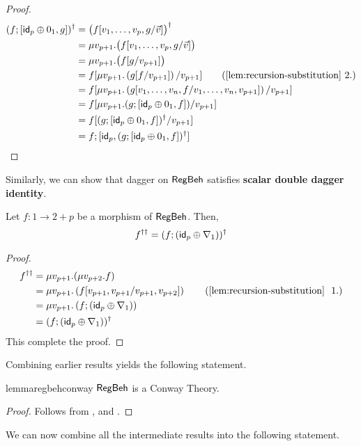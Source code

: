 \begin{proof}
\begin{align*}
(f ; \lc  \id_p \oplus 0_1 , g \rc)^\dagger & = \big(f[v_1,\dots,v_p, g/\vec{v}]\big)^\dagger	
\\
& = \mu v_{p+1}.\big(f[v_1,\dots,v_p, g/\vec{v}]\big)
\\
& = \mu v_{p+1}.\big(f[g/v_{p+1}]\big)
\\
& = f[\mu v_{p+1}. \left(g[f/v_{p+1}]\right)/v_{p+1}] \tag{\Cref{lem:recursion-substitution}~2.}
\\
& = f[\mu v_{p+1}. \left(g[v_1,\dots,v_n,f/v_1,\dots,v_n,v_{p+1}]\right)/v_{p+1}]\\
& = f[\mu v_{p+1}. (g ;  \lc  \id_p \oplus 0_1 , f\rc)/v_{p+1}]
\\
& = f[(g ;  \lc  \id_p \oplus 0_1 , f\rc)^\dagger/v_{p+1}]
\\
& = f ; \lc \id_p, (g ;  \lc  \id_p \oplus 0_1 , f\rc)^\dagger\rc \qedhere
\end{align*}
\end{proof}
Similarly, we can show that dagger on $\mathsf{RegBeh}$ satisfies \textbf{scalar double dagger identity}. 
\begin{lemma}\label{conway3}
Let $f \colon 1 \to 2 + p$ be a morphism of $\mathsf{RegBeh}$. Then,
		$$
		f^{\dagger\dagger} = (f ; (\mathsf{id}_p\oplus \nabla_1))^\dagger
		$$
\end{lemma}
\begin{proof}
\begin{align*}
f^{\dagger\dagger} &= \mu v_{p+1}.(\mu v_{p+2}.f)
\\
& = \mu v_{p+1}. \left(f [v_{p+1}, v_{p+1} / v_{p+1}, v_{p+2}]\right) \tag{\Cref{lem:recursion-substitution}~ 1.}
\\
& = \mu v_{p+1}. \left(f;(\id_p\oplus \nabla_1)\right)
\\
& = (f ; (\id_p\oplus \nabla_1))^\dagger
\end{align*}
This complete the proof.
\end{proof}
Combining earlier results yields the following statement.
\begin{restatable}{lemma}{regbehconway}\label{lem:regbehconway}
$\mathsf{RegBeh}$ is a Conway Theory.	
\end{restatable}
\begin{proof}
	Follows from ,  and .
\end{proof}
We can now combine all the intermediate results into the following statement.
